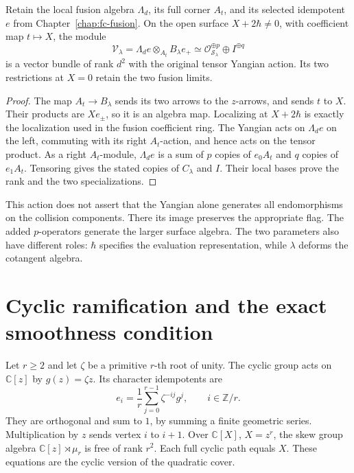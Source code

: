\begin{theorem}\label{thm:cs-yangian-bundle}
Retain the local fusion algebra \(\Lambda_d\), its full corner
\(A_t\), and its selected idempotent \(e\) from
Chapter~\ref{chap:fc-fusion}. On the open surface
\(X+2\hbar\ne0\), with coefficient map \(t\mapsto X\), the module
\[
 \mathcal V_\lambda
 =\Lambda_de\otimes_{A_t}B_\lambda e_+
 \simeq \mathcal O_{\mathcal S_\lambda}^{\oplus p}
          \oplus I^{\oplus q}
\]
is a vector bundle of rank \(d^2\) with the original tensor
Yangian action. Its two restrictions at \(X=0\) retain the two
fusion limits.
\end{theorem}
\begin{proof}
The map \(A_t\to B_\lambda\) sends its two arrows to the \(z\)-arrows,
and sends \(t\) to \(X\). Their products are \(X e_\pm\), so it
is an algebra map. Localizing at \(X+2\hbar\) is exactly the
localization used in the fusion coefficient ring.
The Yangian acts on \(\Lambda_de\) on the left, commuting with its
right \(A_t\)-action, and hence acts on the tensor product.
As a right \(A_t\)-module, \(\Lambda_de\) is a sum of \(p\) copies
of \(e_0A_t\) and \(q\) copies of \(e_1A_t\).
Tensoring gives the stated copies of \(C_\lambda\) and \(I\).
Their local bases prove the rank and the two specializations.
\end{proof}

This action does not assert that the Yangian alone generates all
endomorphisms on the collision components. There its image preserves
the appropriate flag. The added \(p\)-operators generate the larger
surface algebra. The two parameters also have different roles:
\(\hbar\) specifies the evaluation representation, while \(\lambda\)
deforms the cotangent algebra.

\section{Cyclic ramification and the exact smoothness condition}

Let \(r\geq2\) and let \(\zeta\) be a primitive \(r\)-th root of
unity. The cyclic group acts on \(\mathbb C[z]\) by \(g(z)=\zeta z\).
Its character idempotents are
\[
 e_i=\frac1r\sum_{j=0}^{r-1}\zeta^{-ij}g^j,\qquad i\in\mathbb Z/r.
\]
They are orthogonal and sum to \(1\), by summing a finite geometric
series. Multiplication by \(z\) sends vertex \(i\) to \(i+1\).
Over \(\mathbb C[X]\), \(X=z^r\), the skew group algebra
\(\mathbb C[z]\rtimes\mu_r\) is free of rank \(r^2\).
Each full cyclic path equals \(X\). These equations are the cyclic
version of the quadratic cover.

